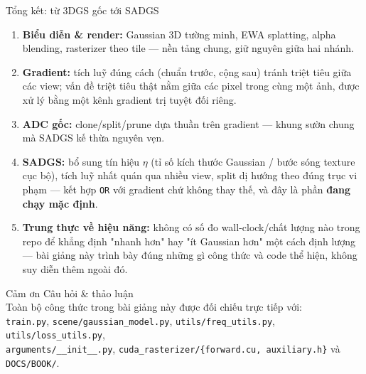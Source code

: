 \begin{frame}{Tổng kết: từ 3DGS gốc tới SADGS}
\scriptsize
\begin{enumerate}\itemsep2pt
    \item \textbf{Biểu diễn \& render:} Gaussian 3D tường minh, EWA splatting, alpha blending, rasterizer theo tile ---
    nền tảng chung, giữ nguyên giữa hai nhánh.
    \item \textbf{Gradient:} tích luỹ đúng cách (chuẩn trước, cộng sau) tránh triệt tiêu giữa các view; vấn đề triệt
    tiêu thật nằm giữa các pixel trong cùng một ảnh, được xử lý bằng một kênh gradient trị tuyệt đối riêng.
    \item \textbf{ADC gốc:} clone/split/prune dựa thuần trên gradient --- khung sườn chung mà SADGS kế thừa nguyên vẹn.
    \item \textbf{SADGS:} bổ sung tín hiệu $\eta$ (tỉ số kích thước Gaussian / bước sóng texture cục bộ), tích luỹ nhất
    quán qua nhiều view, split dị hướng theo đúng trục vi phạm --- kết hợp \texttt{OR} với gradient chứ không thay thế,
    và đây là phần \textbf{đang chạy mặc định}.
    \item \textbf{Trung thực về hiệu năng:} không có số đo wall-clock/chất lượng nào trong repo để khẳng định "nhanh
    hơn" hay "ít Gaussian hơn" một cách định lượng --- bài giảng này trình bày đúng những gì công thức và code thể
    hiện, không suy diễn thêm ngoài đó.
\end{enumerate}
\end{frame}

\begin{frame}{Cảm ơn}
\centering
\vspace{1cm}
{\Large Câu hỏi \& thảo luận}\\[0.8cm]
\footnotesize
Toàn bộ công thức trong bài giảng này được đối chiếu trực tiếp với:\\
\texttt{train.py}, \texttt{scene/gaussian\_model.py}, \texttt{utils/freq\_utils.py}, \texttt{utils/loss\_utils.py},\\
\texttt{arguments/\_\_init\_\_.py}, \texttt{cuda\_rasterizer/\{forward.cu, auxiliary.h\}} và \texttt{DOCS/BOOK/}.
\end{frame}
